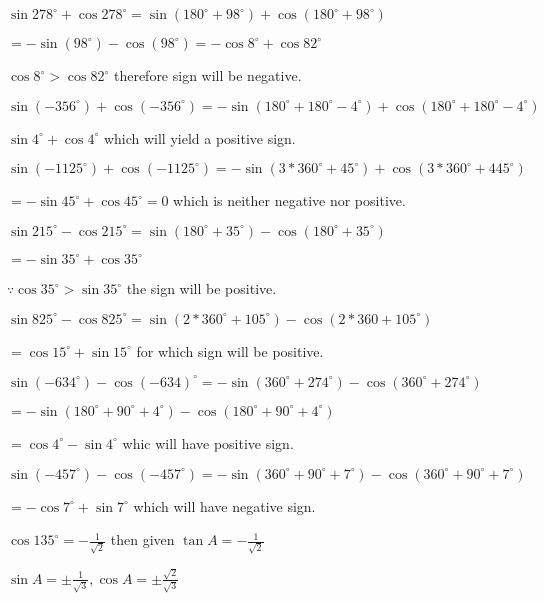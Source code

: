 \item $\sin 278^\circ + \cos 278^\circ = \sin(180^\circ + 98^\circ) + \cos(180^\circ + 98^\circ)$

  $= -\sin(98^\circ) - \cos(98^\circ) = -\cos 8^\circ + \cos 82^\circ$

  $\cos 8^\circ > \cos 82^\circ$ therefore sign will be negative.

\item $\sin(-356^\circ) + \cos(-356^\circ) = -\sin(180^\circ + 180^\circ - 4^\circ) + \cos(180^\circ + 180^\circ - 4^\circ)$

  $\sin 4^\circ + \cos 4^\circ$ which will yield a positive sign.

\item $\sin(-1125^\circ) + \cos(-1125^\circ) = -\sin(3*360^\circ + 45^\circ) + \cos(3*360^\circ + 445^\circ)$

  $= -\sin 45^\circ + \cos 45^\circ = 0$ which is neither negative nor positive.

\item $\sin 215^\circ - \cos 215^\circ = \sin(180^\circ + 35^\circ) - \cos(180^\circ + 35^\circ)$

  $= -\sin 35^\circ + \cos 35^\circ$

  $\because \cos 35^\circ > \sin 35^\circ$ the sign will be positive.

\item $\sin 825^\circ - \cos 825^\circ = \sin(2*360^\circ + 105^\circ) - \cos(2*360 + 105^\circ)$

  $= \cos 15^\circ + \sin 15^\circ$ for which sign will be positive.

\item $\sin(-634^\circ) - \cos(-634)^\circ = -\sin (360^\circ + 274^\circ) - \cos (360^\circ + 274^\circ)$

  $= -\sin(180^\circ + 90^\circ + 4^\circ) - \cos(180^\circ + 90^\circ + 4^\circ)$

  $= \cos 4^\circ - \sin 4^\circ$ whic will have positive sign.

\item $\sin(-457^\circ) - \cos(-457^\circ) = -\sin(360^\circ + 90^\circ + 7^\circ) -\cos(360^\circ + 90^\circ + 7^\circ)$

  $=-\cos 7^\circ + \sin 7^\circ$ which will have negative sign.

\item $\cos 135^\circ = -\frac{1}{\sqrt{2}}$ then given $\tan A = -\frac{1}{\sqrt{2}}$

  $\sin A = \pm \frac{1}{\sqrt{3}}, \cos A = \pm \frac{\sqrt{2}}{\sqrt{3}}$

